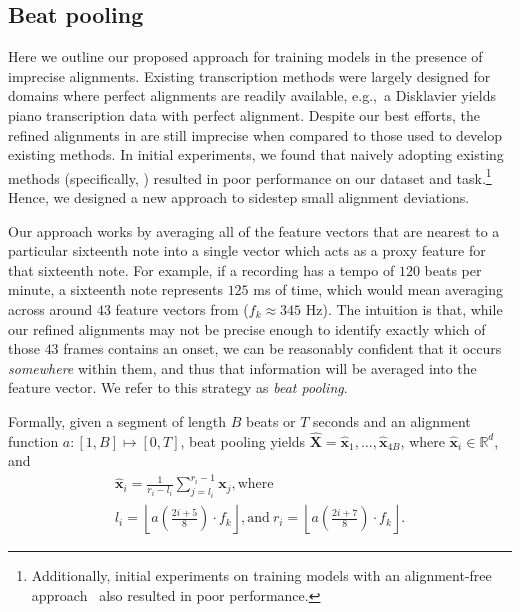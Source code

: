 \subsection{Beat pooling}
\label{sec:beatpool}

Here we outline our proposed approach for training models in the presence of imprecise alignments. 
Existing transcription methods were largely designed for domains where perfect alignments are readily available, e.g.,~a Disklavier yields piano transcription data with perfect alignment. 
Despite our best efforts, the refined alignments in \hooktheory{} are still imprecise when compared to those used to develop existing methods. 
In initial experiments, we found that naively adopting existing methods (specifically, \cite{hawthorne2017onsets,hawthorne2021sequence}) resulted in poor performance on our dataset and task.\footnote{Additionally, initial experiments on training models with an alignment-free approach~\cite{graves2006connectionist} also resulted in poor performance.} 
Hence, we designed a new approach to sidestep small alignment deviations.

Our approach works by averaging all of the feature vectors that are nearest to a particular sixteenth note into a single vector which acts as a proxy feature for that sixteenth note. 
For example, if a recording has a tempo of $120$ beats per minute, a sixteenth note represents $125$ ms of time, which would mean averaging across around $43$ feature vectors from \jukebox{} ($f_k \approx 345$ Hz). 
The intuition is that, while our refined alignments may not be precise enough to identify exactly which of those $43$ frames contains an onset, we can be reasonably confident that it occurs \emph{somewhere} within them, and thus that information will be averaged into the feature vector.
We refer to this strategy as \emph{beat pooling}.

Formally, given a segment of length $B$ beats or $T$ seconds and an alignment function ${a: [1, B] \mapsto [0, T]}$, beat pooling yields ${\hat{\bm{X}} = \hat{\bm{x}}_1, \ldots, \hat{\bm{x}}_{4B}}$, where ${\hat{\bm{x}}_i \in \mathbb{R}^d}$, and
\begin{gather*}
\bm{\hat{x}}_i = \frac{1}{r_i - l_i} \sum_{j = l_i}^{r_i - 1} \bm{x}_j, \text{where} \\
l_i = \left\lfloor a \left(\frac{2i + 5}{8} \right) \cdot f_k \right\rfloor, \text{and}~
r_i = \left\lfloor a \left(\frac{2i + 7}{8} \right) \cdot f_k \right\rfloor.
\end{gather*}

